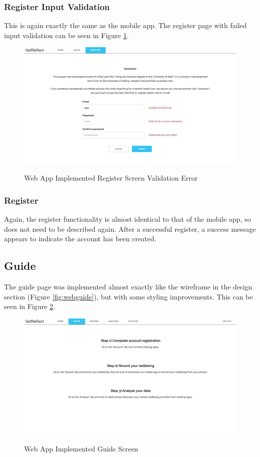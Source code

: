 \documentclass[11pt,openright,a4paper]{report}
\begin{document}
\subsubsection{Register Input Validation}
This is again exactly the same as the mobile app. The register page with failed input validation can be seen in Figure \ref{fig:webregistererror}.

\begin{figure}[ht]
\centering
\caption{Web App Implemented Register Screen Validation Error}
\includegraphics[width=\textwidth]{i/webregistererror.png}
\label{fig:webregistererror}
\end{figure}


\subsubsection{Register}
Again, the register functionality is almost identical to that of the mobile app, so does not need to be described again. After a successful register, a success message appears to indicate the account has been created.

\subsection{Guide} \label{subsec:guide}
The guide page was implemented almost exactly like the wireframe in the design section (Figure \ref{fig:webguide}), but with some styling improvements. This can be seen in Figure \ref{fig:webguideimpl}.

\begin{figure}[ht]
\centering
\caption{Web App Implemented Guide Screen}
\includegraphics[width=\textwidth]{i/webguideimpl.png}
\label{fig:webguideimpl}
\end{figure}
\end{document}
